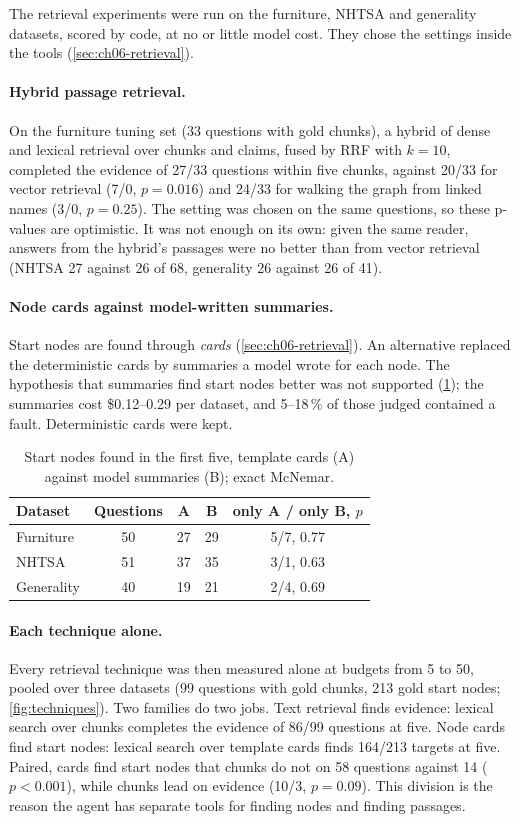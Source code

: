 The retrieval experiments were run on the furniture, NHTSA and generality datasets, scored by code, at no or little
model cost. They chose the settings inside the tools (\cref{sec:ch06-retrieval}).

\paragraph{Hybrid passage retrieval.} On the furniture tuning set (33 questions with gold chunks), a hybrid of dense
and lexical retrieval over chunks and claims, fused by RRF with $k=10$, completed the evidence of 27/33 questions
within five chunks, against 20/33 for vector retrieval (7/0, $p = 0.016$) and 24/33 for walking the graph from linked
names (3/0, $p = 0.25$). The setting was chosen on the same questions, so these p-values are optimistic. It was not
enough on its own: given the same reader, answers from the hybrid's passages were no better than from vector
retrieval (NHTSA 27 against 26 of 68, generality 26 against 26 of 41).

\paragraph{Node cards against model-written summaries.} Start nodes are found through \emph{cards}
(\cref{sec:ch06-retrieval}). An alternative replaced the deterministic cards by summaries a model wrote for each node.
The hypothesis that summaries find start nodes better was not supported (\cref{tab:cards}); the summaries cost
\$0.12--0.29 per dataset, and 5--18\,\% of those judged contained a fault. Deterministic cards were kept.

\begin{table}[htbp]
\centering
\caption{Start nodes found in the first five, template cards (A) against model summaries (B); exact McNemar.}
\label{tab:cards}
\small
\begin{tabular}{@{}lcccc@{}}
\toprule
Dataset & Questions & A & B & only A / only B, $p$ \\
\midrule
Furniture & 50 & 27 & 29 & 5/7, 0.77 \\
NHTSA & 51 & 37 & 35 & 3/1, 0.63 \\
Generality & 40 & 19 & 21 & 2/4, 0.69 \\
\bottomrule
\end{tabular}
\end{table}

\paragraph{Each technique alone.} Every retrieval technique was then measured alone at budgets from 5 to 50, pooled
over three datasets (99 questions with gold chunks, 213 gold start nodes; \cref{fig:techniques}). Two families do two
jobs. Text retrieval finds evidence: lexical search over chunks completes the evidence of 86/99 questions at five.
Node cards find start nodes: lexical search over template cards finds 164/213 targets at five. Paired, cards find start
nodes that chunks do not on 58 questions against 14 ($p < 0.001$), while chunks lead on evidence (10/3, $p = 0.09$).
This division is the reason the agent has separate tools for finding nodes and finding passages.

